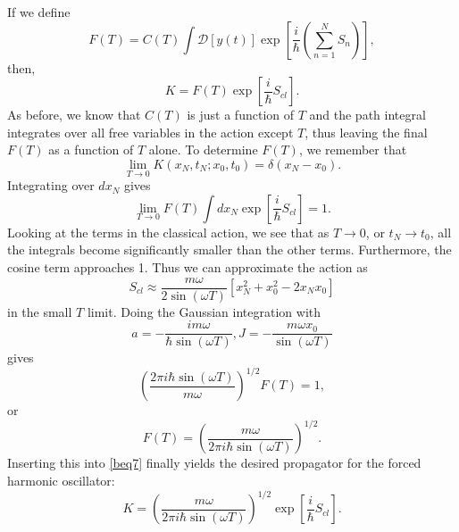 If we define 
\begin{equation}
    \label{Fdef}
    F(T)=C(T)\int \mathcal D[y(t)]\exp[\frac i \hbar (\sum_{n=1}^N S_n)],
\end{equation}
then, 
\begin{equation} \label{beq7}
    K=F(T)\exp[\frac i \hbar S_{cl}].
\end{equation}
As before, we know that $C(T)$ is just a function of $T$ and the path integral integrates over all free variables in the action except $T$, thus leaving the final $F(T)$ as a function of $T$ alone. To determine $F(T)$, we remember that 
\begin{equation}
    \lim_{T\to 0} K(x_N,t_N;x_0,t_0)=\delta(x_N-x_0).
\end{equation}
Integrating over $dx_N$ gives
\begin{equation}
    \lim_{T\to 0}F(T)\int dx_N\exp[\frac i \hbar S_{cl}]=1.
\end{equation}
Looking at the terms in the classical action, we see that as $T\to 0$, or $t_N\to t_0$, all the integrals become significantly smaller than the other terms. Furthermore, the cosine term approaches 1. Thus we can approximate the action as 
\begin{equation}
    S_{cl}\approx \frac{m \omega}{2\sin(\omega T)}[x_N^2+x_0^2-2x_Nx_0]
\end{equation}
in the small $T$ limit. Doing the Gaussian integration with 
\begin{equation}
    a=-\frac{i m \omega }{\hbar \sin(\omega T)}, J=-\frac{m \omega x_0}{\sin(\omega T)}
\end{equation}
gives
\begin{equation}
    \left ( \frac{2\pi i \hbar \sin(\omega T)}{m\omega}\right)^{1/2}F(T)=1,
\end{equation}
or
\begin{equation}
    F(T)=\left( \frac{m\omega}{2\pi i \hbar \sin(\omega T)}\right)^{1/2}.
\end{equation}
Inserting this into \eqref{beq7} finally yields the desired propagator for the forced harmonic oscillator:
\begin{equation} \label{beq8}
    K=\left( \frac{m\omega}{2\pi i \hbar \sin(\omega T)}\right)^{1/2}\exp[\frac i \hbar S_{cl}].
\end{equation}
